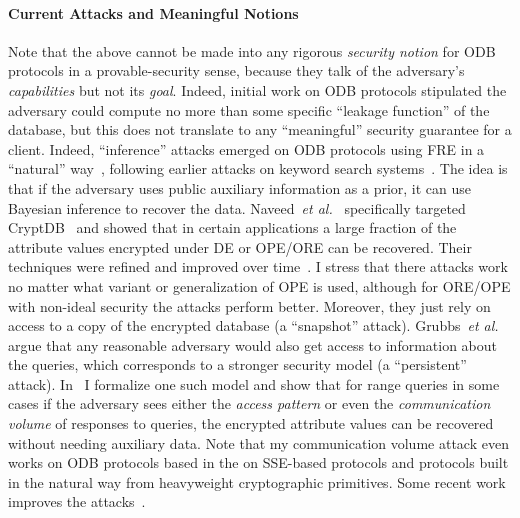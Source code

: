 \paragraph*{Current Attacks and Meaningful Notions} 
Note that the above cannot be made into any rigorous \emph{security notion} for ODB protocols in a provable-security sense, because they talk of the adversary's \emph{capabilities} but not its \emph{goal}.  Indeed, initial work on ODB protocols stipulated the adversary could compute no more than some specific ``leakage function'' of the database, but this does not translate to any ``meaningful'' security guarantee for a client.  
Indeed, ``inference'' attacks emerged on ODB protocols using FRE in a ``natural'' way~\cite{naveed15,CCS:DurDubCas16,CCS:PouWri16}, following earlier attacks on keyword search systems~\cite{hore12, arasu13, islam14, cash15}. The  idea is that if the adversary uses public auxiliary information as a prior, it can use Bayesian inference to recover the data.  Naveed~\emph{et al.}~\cite{naveed15} specifically targeted CryptDB~\cite{PRZB11} and showed that in certain applications a large fraction of the attribute values encrypted under DE or OPE/ORE can be recovered.  Their techniques were refined and improved over time~\cite{SP:Paul GSBNR17,EPRINT:BGCRS17}.   I stress that there attacks work no matter what variant or generalization of OPE is used, although for ORE/OPE with non-ideal security the attacks perform better. 
Moreover, they just rely on access to a copy of the encrypted database (a ``snapshot'' attack).  Grubbs~\emph{et al.}~\cite{Grubbs:2017} argue that  any reasonable adversary would also get access to information about the queries, which corresponds to a stronger security model (a ``persistent'' attack). In~\cite{CCS:KKNO16} I formalize one such model and  show that for range queries in some cases if the adversary sees either the \emph{access pattern} or even the \emph{communication volume} of responses to queries, the encrypted attribute values can be recovered without needing auxiliary data.  Note that my communication volume  attack even works on ODB protocols based in the on SSE-based protocols and protocols built in the natural way from heavyweight cryptographic primitives.  Some recent work improves the attacks~\cite{EPRINT:LacMinPat17}.  

